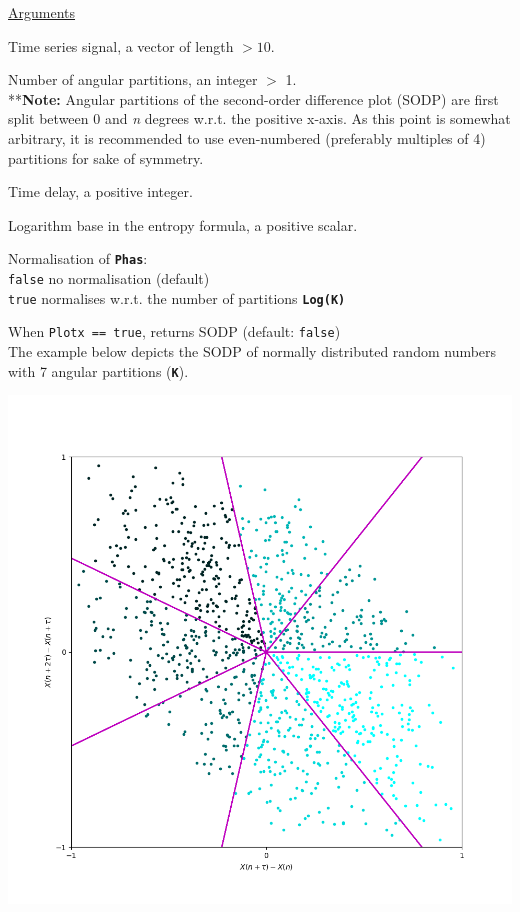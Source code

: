 \documentclass[12pt, a4paper, titlepage, openany]{book}
\begin{document}
\noindent \ul{Arguments}
\begin{description}[labelsep=1cm, labelwidth=2cm, nosep, style=multiline,leftmargin=3cm]\footnotesize
\item[\texttt{Sig}]		Time series signal, a vector of length $> 10$.
\item[\texttt{K}]		Number of angular partitions, an integer $>$ 1.\\
				**\textbf{Note:} Angular partitions of the second-order difference plot (SODP) are first split between 0 and \textit{n} degrees w.r.t. the positive x-axis. As this point is somewhat arbitrary, it is recommended to use even-numbered (preferably multiples of 4) partitions for sake of symmetry.
\item[\texttt{tau}]		Time delay, a positive integer.
\item[\texttt{Logx}]	Logarithm base in the entropy formula, a positive scalar.
\item[\texttt{Norm}]	Normalisation of \texttt{\textbf{Phas}}:\\
						\texttt{false} \hspace{10pt} no normalisation (default)\\
						\texttt{true} \hspace{15pt} normalises w.r.t. the number of partitions \texttt{\textbf{Log(K)}}
\item[\texttt{Plotx}]	When \texttt{Plotx == true}, returns SODP (default: \texttt{false})\\
						The example below depicts the SODP of normally distributed random numbers with 7 angular partitions (\texttt{\textbf{K}}).
\item[ ]				\includegraphics[scale=.34]{Phas1.png}	
\end{description}
\end{document}
